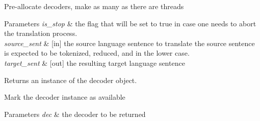 
\begin{DoxyRefList}
\item[\label{todo__todo000003}%
\hypertarget{todo__todo000003}{}%
Member \hyperlink{classuva_1_1smt_1_1bpbd_1_1server_1_1decoder_1_1de__configurator_aadf303dc8fbc43df002f0d8bdb97facb}{uva\+:\+:smt\+:\+:bpbd\+:\+:server\+:\+:decoder\+:\+:de\+\_\+configurator\+:\+:allocate\+\_\+decoder} (acr\+\_\+bool\+\_\+flag is\+\_\+stop, const string \&source\+\_\+sent, string \&target\+\_\+sent)]Pre-\/allocate decoders, make as many as there are threads 
\begin{DoxyParams}{Parameters}
{\em is\+\_\+stop} & the flag that will be set to true in case one needs to abort the translation process. \\
\hline
{\em source\+\_\+sent} & \mbox{[}in\mbox{]} the source language sentence to translate the source sentence is expected to be tokenized, reduced, and in the lower case. \\
\hline
{\em target\+\_\+sent} & \mbox{[}out\mbox{]} the resulting target language sentence \\
\hline
\end{DoxyParams}
\begin{DoxyReturn}{Returns}
an instance of the decoder object.  
\end{DoxyReturn}

\item[\label{todo__todo000004}%
\hypertarget{todo__todo000004}{}%
Member \hyperlink{classuva_1_1smt_1_1bpbd_1_1server_1_1decoder_1_1de__configurator_a0518550eb8a56127225376ccb996d3f2}{uva\+:\+:smt\+:\+:bpbd\+:\+:server\+:\+:decoder\+:\+:de\+\_\+configurator\+:\+:dispose\+\_\+decoder} (sentence\+\_\+decoder \&dec)]Mark the decoder instance as available 
\begin{DoxyParams}{Parameters}
{\em dec} & the decoder to be returned  \\
\hline
\end{DoxyParams}


\end{DoxyRefList}
